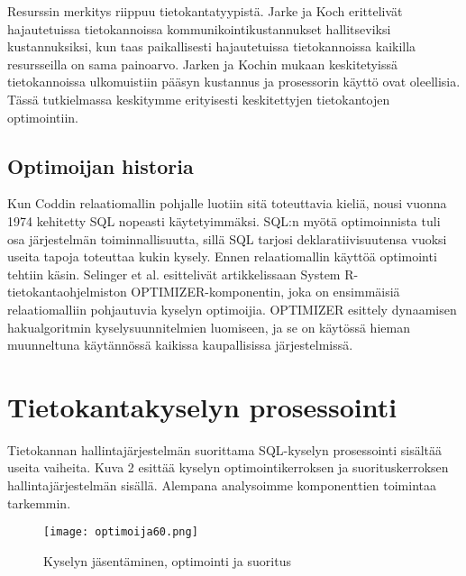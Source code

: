 \documentclass[finnish]{tktltiki2}
\theoremstyle{definition}
\theoremstyle{remark}
\begin{document}
Resurssin merkitys riippuu tietokantatyypistä. Jarke ja Koch erittelivät hajautetuissa tietokannoissa kommunikointikustannukset hallitseviksi kustannuksiksi, kun taas paikallisesti hajautetuissa tietokannoissa kaikilla resursseilla on sama painoarvo. Jarken ja Kochin mukaan keskitetyissä tietokannoissa ulkomuistiin pääsyn kustannus ja prosessorin käyttö ovat oleellisia. Tässä tutkielmassa keskitymme erityisesti keskitettyjen tietokantojen optimointiin.

\subsection{Optimoijan historia}
Kun Coddin relaatiomallin pohjalle luotiin sitä toteuttavia kieliä, nousi vuonna 1974 kehitetty SQL nopeasti käytetyimmäksi. SQL:n myötä optimoinnista tuli osa järjestelmän toiminnallisuutta, sillä SQL tarjosi deklaratiivisuutensa vuoksi useita tapoja toteuttaa kukin kysely. Ennen relaatiomallin käyttöä optimointi tehtiin käsin.
Selinger et al. esittelivät artikkelissaan \cite{selinger1979access} System R-tietokantaohjelmiston OPTIMIZER-komponentin, joka on ensimmäisiä relaatiomalliin pohjautuvia kyselyn optimoijia. OPTIMIZER esittely dynaamisen hakualgoritmin kyselysuunnitelmien luomiseen, ja se on käytössä hieman muunneltuna käytännössä kaikissa kaupallisissa järjestelmissä. \cite{ioannidis1996query}


\section{Tietokantakyselyn prosessointi}
Tietokannan hallintajärjestelmän suorittama SQL-kyselyn prosessointi sisältää useita vaiheita. Kuva 2 esittää kyselyn optimointikerroksen ja suorituskerroksen hallintajärjestelmän sisällä. Alempana analysoimme komponenttien toimintaa tarkemmin.

\begin{figure}[!h]
  \caption{Kyselyn jäsentäminen, optimointi ja suoritus}
  \centering
    \texttt{[image: optimoija60.png]}
\end{figure}
\end{document}
